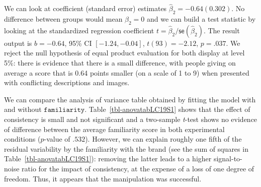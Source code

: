 \documentclass[
  11pt,
  letterpaper,
]{scrbook}
\theoremstyle{definition}
\theoremstyle{remark}
\begin{document}
We can look at coefficient (standard error) estimates
\(\widehat{\beta}_2 = -0.64 (0.302)\). No difference between groups
would mean \(\beta_2=0\) and we can build a test statistic by looking at
the standardized regression coefficient
\(t = \widehat{\beta}_2/\mathsf{se}(\widehat{\beta}_2)\). The result
output is \(b = -0.64\), 95\% CI \([-1.24, -0.04]\), \(t(93) = -2.12\),
\(p = .037\). We reject the null hypothesis of equal product evaluation
for both display at level 5\%: there is evidence that there is a small
difference, with people giving on average a score that is 0.64 points
smaller (on a scale of 1 to 9) when presented with conflicting
descriptions and images.

We can compare the analysis of variance table obtained by fitting the
model with and without \(\texttt{familiarity}\).
Table~\ref{tbl-anovatabLC19S1} shows that the effect of consistency is
small and not significant and a two-sample \emph{t}-test shows no
evidence of difference between the average familiarity score in both
experimental conditions (\(p\)-value of \(.532\)). However, we can
explain roughly one fifth of the residual variability by the familiarity
with the brand (see the sum of squares in
Table~\ref{tbl-anovatabLC19S1}): removing the latter leads to a higher
signal-to-noise ratio for the impact of consistency, at the expense of a
loss of one degree of freedom. Thus, it appears that the manipulation
was successful.
\end{document}
